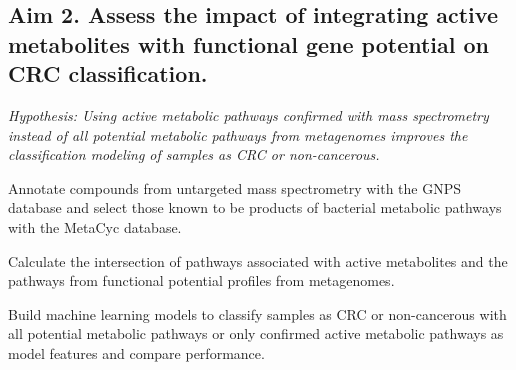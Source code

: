 \documentclass[12pt]{article}
\begin{document}
\subsection*{Aim 2. Assess the impact of integrating active metabolites with functional gene potential on CRC classification.}
\textit{Hypothesis: Using active metabolic pathways confirmed with mass spectrometry instead of all potential metabolic pathways from metagenomes improves the classification modeling of samples as CRC or non-cancerous.}
\begin{compactenum}[A.]
    \item Annotate compounds from untargeted mass spectrometry with the GNPS database and select those known to be products of bacterial metabolic pathways with the MetaCyc database.
    \item Calculate the intersection of pathways associated with active metabolites and the pathways from functional potential profiles from metagenomes.
    \item Build machine learning models to classify samples as CRC or non-cancerous with all potential metabolic pathways or only confirmed active metabolic pathways as model features and compare performance.
\end{compactenum}


\pagebreak

\footnotesize{

\par}
\end{document}

